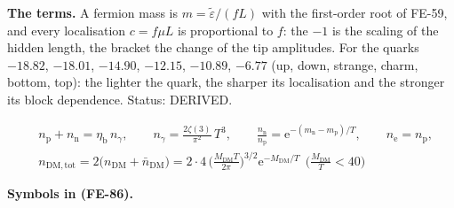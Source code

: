 \documentclass[
  10pt,
]{article}
\begin{document}
\textbf{The terms.} A fermion mass is \(m = \tilde\varepsilon/(fL)\)
with the first-order root of FE-59, and every localisation
\(c = f\mu L\) is proportional to \(f\): the \(-1\) is the scaling of
the hidden length, the bracket the change of the tip amplitudes. For the
quarks \(-18.82\), \(-18.01\), \(-14.90\), \(-12.15\), \(-10.89\),
\(-6.77\) (up, down, strange, charm, bottom, top): the lighter the
quark, the sharper its localisation and the stronger its block
dependence. Status: DERIVED.

\[
\begin{aligned}
&n_{\mathrm{p}} + n_{\mathrm{n}} = \eta_{\mathrm{b}}\,n_\gamma,\qquad n_\gamma =
 \frac{2\zeta(3)}{\pi^2}\,T^3,\qquad
 \frac{n_{\mathrm{n}}}{n_{\mathrm{p}}} = \mathrm{e}^{-(m_{\mathrm{n}} - m_{\mathrm{p}})/T},\qquad
 n_{\mathrm{e}} = n_{\mathrm{p}},\\
&n_{\mathrm{DM,tot}} = 2\big(n_{\mathrm{DM}} + \bar n_{\mathrm{DM}}\big) =
 2\cdot4\,\Big(\frac{M_{\mathrm{DM}}T}{2\pi}\Big)^{3/2}\mathrm{e}^{-M_{\mathrm{DM}}/T}
 \ \ \Big(\frac{M_{\mathrm{DM}}}{T} < 40\Big)
\end{aligned} \tag{FE-86}
\]

\textbf{Symbols in (FE-86).}
\end{document}
